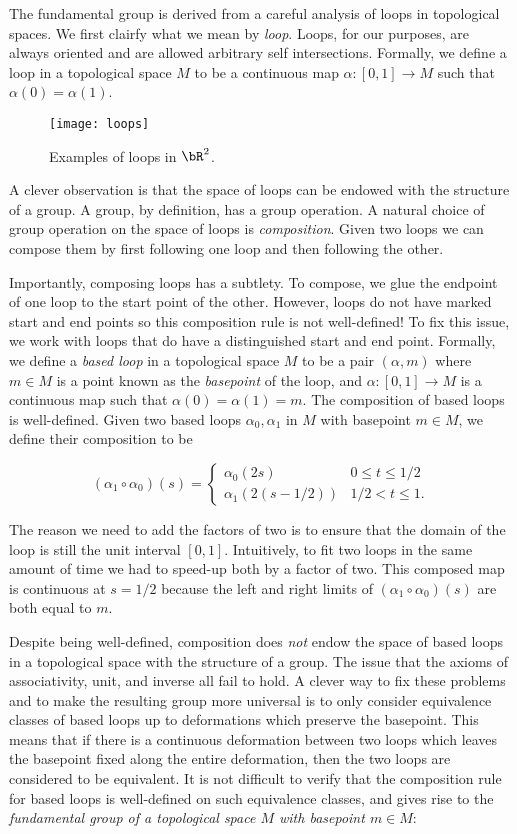 The fundamental group is derived from a careful analysis of loops in topological spaces. We first clairfy what we mean by {\em loop}. Loops, for our purposes, are always oriented and are allowed arbitrary self intersections. Formally, we define a loop in a topological space $M$ to be a continuous map $\alpha:[0,1]\to M$ such that $\alpha(0)=\alpha(1)$.

\begin{figure}
\begin{center}
\texttt{[image: loops]}
\caption{Examples of loops in $\bR^2$.}
\label{loops}
\end{center}
\end{figure}

A clever observation is that the space of loops can be endowed with the structure of a group. A group, by definition, has a group operation. A natural choice of group operation on the space of loops is {\em composition}. Given two loops we can compose them by first following one loop and then following the other.

Importantly, composing loops has a subtlety. To compose, we glue the endpoint of one loop to the start point of the other. However, loops do not have marked start and end points so this composition rule is not well-defined! To fix this issue, we work with loops that do have a distinguished start and end point. Formally, we define a {\em based loop} in a topological space $M$ to be a pair $(\alpha,m)$ where $m\in M$ is a point known as the {\em basepoint} of the loop, and $\alpha:[0,1]\to M$ is a continuous map such that $\alpha(0)=\alpha(1)=m$. The composition of based loops is well-defined. Given two based loops $\alpha_0,\alpha_1$ in $M$ with basepoint $m\in M$, we define their composition to be

$$
(\alpha_1 \circ \alpha_0)(s)=
\begin{cases}
\alpha_0(2s) & 0\leq t \leq 1/2 \\
\alpha_1(2(s-1/2)) & 1/2 < t \leq 1.
\end{cases}$$

The reason we need to add the factors of two is to ensure that the domain of the loop is still the unit interval $[0,1]$. Intuitively, to fit two loops in the same amount of time we had to speed-up both by a factor of two. This composed map is continuous at $s=1/2$ because the left and right limits of $(\alpha_1 \circ \alpha_0)(s)$ are both equal to $m$.

Despite being well-defined, composition does {\em not} endow the space of based loops in a topological space with the structure of a group. The issue that the axioms of associativity, unit, and inverse all fail to hold. A clever way to fix these problems and to make the resulting group more universal is to only consider equivalence classes of based loops up to deformations which preserve the basepoint. This means that if there is a continuous deformation between two loops which leaves the basepoint fixed along the entire deformation, then the two loops are considered to be equivalent. It is not difficult to verify that the composition rule for based loops is well-defined on such equivalence classes, and gives rise to the {\em fundamental group of a topological space $M$ with basepoint $m\in M$}:


